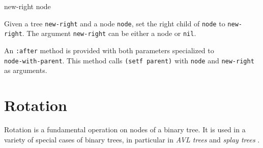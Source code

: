 {new-right node}

Given a tree \texttt{new-right} and a node \texttt{node}, set the
right child of \texttt{node} to \texttt{new-right}.  The argument
\texttt{new-right} can be either a node or \texttt{nil}.

An \texttt{:after} method is provided with both parameters specialized
to\\ \texttt{node-with-parent}.  This method calls \texttt{(setf
  parent)} with \texttt{node} and \texttt{new-right} as arguments.

\section{Rotation}

Rotation is a fundamental operation on nodes of a binary tree.  It is
used in a variety of special cases of binary trees, in particular in
\emph{AVL trees} \cite{Adelson-Velskii_Landis_1962} and \emph{splay
  trees} \cite{Sleator:1985:SBS:3828.3835}.
